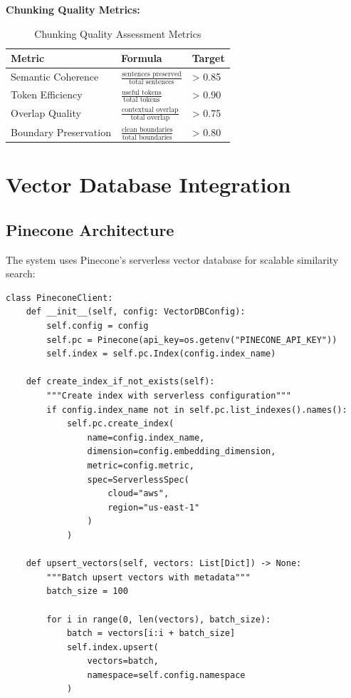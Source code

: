 \documentclass[12pt,a4paper]{article}
\begin{document}
\textbf{Chunking Quality Metrics:}

\begin{table}[H]
\centering
\begin{tabular}{@{}lll@{}}
\toprule
\textbf{Metric} & \textbf{Formula} & \textbf{Target} \\
\midrule
Semantic Coherence & $\frac{\text{sentences preserved}}{\text{total sentences}}$ & > 0.85 \\
Token Efficiency & $\frac{\text{useful tokens}}{\text{total tokens}}$ & > 0.90 \\
Overlap Quality & $\frac{\text{contextual overlap}}{\text{total overlap}}$ & > 0.75 \\
Boundary Preservation & $\frac{\text{clean boundaries}}{\text{total boundaries}}$ & > 0.80 \\
\bottomrule
\end{tabular}
\caption{Chunking Quality Assessment Metrics}
\end{table}

\section{Vector Database Integration}

\subsection{Pinecone Architecture}

The system uses Pinecone's serverless vector database for scalable similarity search:

\begin{lstlisting}[caption=Pinecone Client Implementation]
class PineconeClient:
    def __init__(self, config: VectorDBConfig):
        self.config = config
        self.pc = Pinecone(api_key=os.getenv("PINECONE_API_KEY"))
        self.index = self.pc.Index(config.index_name)
    
    def create_index_if_not_exists(self):
        """Create index with serverless configuration"""
        if config.index_name not in self.pc.list_indexes().names():
            self.pc.create_index(
                name=config.index_name,
                dimension=config.embedding_dimension,
                metric=config.metric,
                spec=ServerlessSpec(
                    cloud="aws",
                    region="us-east-1"
                )
            )
    
    def upsert_vectors(self, vectors: List[Dict]) -> None:
        """Batch upsert vectors with metadata"""
        batch_size = 100
        
        for i in range(0, len(vectors), batch_size):
            batch = vectors[i:i + batch_size]
            self.index.upsert(
                vectors=batch,
                namespace=self.config.namespace
            )
\end{lstlisting}
\end{document}
